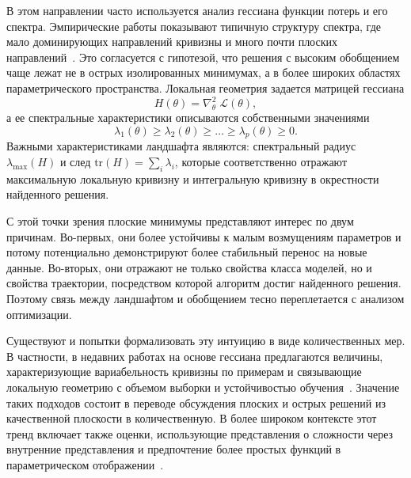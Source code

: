 В этом направлении часто используется анализ гессиана функции потерь и его спектра.
Эмпирические работы показывают типичную структуру спектра, где мало доминирующих направлений кривизны и много почти плоских направлений~\cite{sagun2017eigenvalues,hessian2019sgd,hessianpowerlaw2022}.
Это согласуется с гипотезой, что решения с высоким обобщением чаще лежат не в острых изолированных минимумах, а в более широких областях параметрического пространства.
Локальная геометрия задается матрицей гессиана
\begin{equation}
H(\theta)=\nabla^2_{\theta}\;\mathcal L(\theta),
\label{eq:hessian_def}
\end{equation}
а ее спектральные характеристики описываются собственными значениями
\begin{equation}
\lambda_1(\theta)\ge \lambda_2(\theta)\ge \dots \ge \lambda_p(\theta)\ge 0.
\label{eq:hessian_spectrum}
\end{equation}
Важными характеристиками ландшафта являются: спектральный радиус $\lambda_{\max}(H)$ и след $\mathrm{tr}(H)=\sum_i \lambda_i$, которые соответственно отражают максимальную локальную кривизну и интегральную кривизну в окрестности найденного решения.

С этой точки зрения плоские минимумы представляют интерес по двум причинам.
Во-первых, они более устойчивы к малым возмущениям параметров и потому потенциально демонстрируют более стабильный перенос на новые данные.
Во-вторых, они отражают не только свойства класса моделей, но и свойства траектории, посредством которой алгоритм достиг найденного решения.
Поэтому связь между ландшафтом и обобщением тесно переплетается с анализом оптимизации.

Существуют и попытки формализовать эту интуицию в виде количественных мер.
В частности, в недавних работах на основе гессиана предлагаются величины, характеризующие вариабельность кривизны по примерам и связывающие локальную геометрию с объемом выборки и устойчивостью обучения~\cite{kiselev2024unraveling}.
Значение таких подходов состоит в переводе обсуждения плоских и острых решений из качественной плоскости в количественную.
В более широком контексте этот тренд включает также оценки, использующие представления о сложности через внутренние представления и предпочтение более простых функций в параметрическом отображении~\cite{representation2020complexity,simplicitybias2018}.

